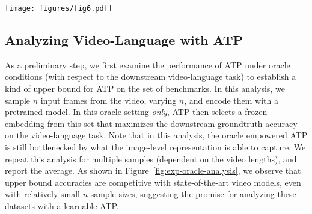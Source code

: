 \begin{figure*}[t]
\begin{center}
\centerline{\texttt{[image: figures/fig6.pdf]}}
\vskip -0.1in
\caption{\textbf{ATP analysis (qualitative results).} We visualize example videos from the NExT-QA dataset \cite{xiao2021next}, along with the selections ATP made from a random sparse sample of frames. Both questions shown here are examples of ``causal-how'' questions in the dataset (shown with the top-4 answer options, for clarity). \textbf{(a)} We find that our ATP model can select informative frames for the downstream Video QA task, when possible, and that many questions initially intended to assess causal or temporal understanding can be answered from single-frame semantics. \textbf{(b)} Conversely, for (video, question) inputs that necessitate a deeper \textit{multi-frame} understanding of event relationships or dynamics, ATP's selected embedding is insufficient to answer the query. See Sec.~\ref{sec:exp:atp} (additional visuals and datasets in supplement).
}
\label{fig:exp-nextqa-qual}
\end{center}
\vskip -0.3in
\end{figure*}


\subsection{Analyzing Video-Language with ATP}
\label{sec:exp:atp}

 As a preliminary step, we first examine the performance of ATP under oracle conditions (with respect to the downstream video-language task) to establish a kind of upper bound for ATP on the set of benchmarks. In this analysis, we sample $n$ input frames from the video, varying $n$, and encode them with a pretrained model. In this oracle setting \textit{only}, ATP then selects a frozen embedding from this set that maximizes the downstream groundtruth accuracy on the video-language task. Note that in this analysis, the oracle empowered ATP is still bottlenecked by what the image-level representation is able to capture. We repeat this analysis for multiple samples (dependent on the video lengths), and report the average. As shown in Figure~\ref{fig:exp-oracle-analysis}, we observe that upper bound accuracies are competitive with state-of-the-art video models, even with relatively small $n$ sample sizes, suggesting the promise for analyzing these datasets with a learnable ATP.

